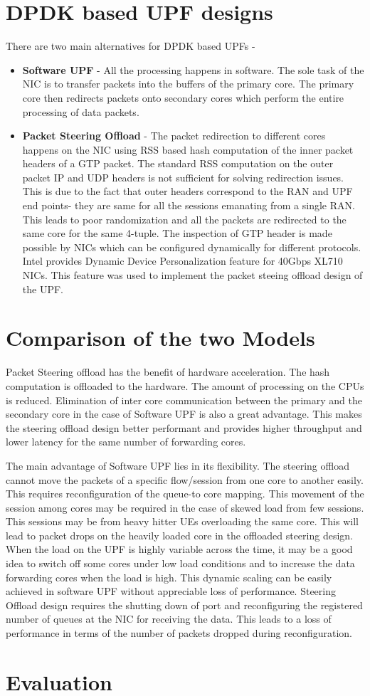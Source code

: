 
\section{DPDK based UPF designs}
There are two main alternatives for DPDK based UPFs -
\begin{itemize}
	\item \textbf{Software UPF} - All the processing happens in software. The sole task of 
	the NIC is to transfer packets into the buffers of the primary core. The primary core then 
	redirects packets onto secondary cores which perform the entire processing of data packets.
	\item \textbf{Packet Steering Offload} - The packet redirection to different cores happens on the NIC using RSS based hash 
	computation of the inner packet headers of a GTP packet. The standard RSS computation on the outer packet IP and UDP headers is not sufficient for solving redirection issues. This is due to the fact that outer headers correspond to the RAN and UPF end points- they are same for all the sessions emanating from a single RAN. This leads to poor randomization and all the packets are redirected to the same core for the same 4-tuple. The inspection of GTP header is made possible by NICs which can be configured dynamically for different protocols. Intel provides Dynamic Device Personalization feature for 40Gbps XL710 NICs. This feature was used to implement the packet steeing offload design of the UPF. 
\end{itemize}
\section{Comparison of the two Models}
Packet Steering offload has the benefit of hardware acceleration. The hash computation is offloaded to the hardware. The amount of processing on the CPUs is reduced. Elimination of inter core communication between the primary and the secondary core in the case of Software UPF is also a great advantage. This makes the steering offload design better performant and provides higher throughput and lower latency for the same number of forwarding cores. 

The main advantage of Software UPF lies in its flexibility. The steering offload cannot move the packets of a specific flow/session from one core to another easily. This requires reconfiguration of the queue-to core mapping. 
This movement of the session among cores may be required in the case of skewed load from few sessions. This sessions may be from heavy hitter UEs overloading the same core. This will lead to packet drops on the heavily loaded core in the offloaded steering design.
When the load on the UPF is highly variable across the time, it may be a good idea to switch off some cores under low load conditions and to increase the data
 forwarding cores when the load is high. This dynamic scaling can be easily
  achieved in software UPF without appreciable loss of performance. Steering Offload design requires the shutting down of port and reconfiguring the registered number of queues at the NIC for receiving the data. This leads to a loss of performance in terms of the number of packets dropped during reconfiguration.
 
\section{Evaluation}